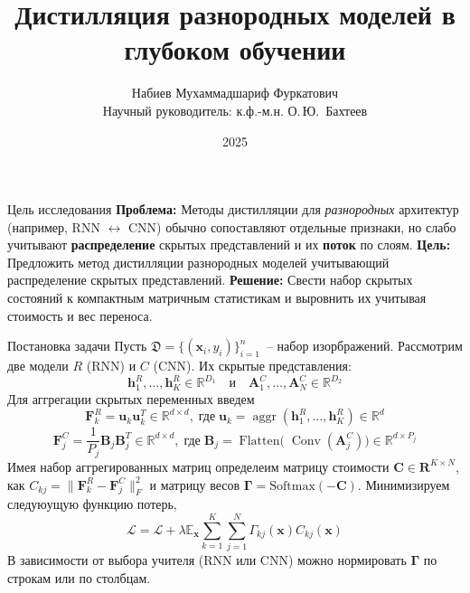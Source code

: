 \documentclass{beamer}
\title{Дистилляция разнородных моделей в глубоком обучении}
\author[М.\,Ф. Набиев]{
    Набиев Мухаммадшариф Фуркатович \\
    Научный руководитель: к.ф.-м.н. О.\,Ю.~Бахтеев
}
\institute[Московский физико-технический институт]{
\small{
    Московский физико-технический институт \\
    Кафедра интеллектуальных систем ФПМИ МФТИ 
}}
\date{2025}
\begin{document}
\begin{frame}
\thispagestyle{empty}
\maketitle
\end{frame}
\begin{frame}{Цель исследования}
\textbf{Проблема:} Методы дистилляции для \emph{разнородных} архитектур (например, RNN $\leftrightarrow$ CNN) обычно сопоставляют отдельные признаки, но слабо учитывают \textbf{распределение} скрытых представлений и их \textbf{поток} по слоям.
\newline 
\newline 
\textbf{Цель:} Предложить метод дистилляции разнородных моделей учитывающий распределение скрытых представлений.
\newline
\newline
\textbf{Решение:} Свести набор скрытых состояний к компактным матричным статистикам и выровнить их учитывая стоимость и вес переноса.
\end{frame}
\begin{frame}{Постановка задачи}
\small
Пусть \(\mathfrak{D} = \{(\mathbf{x}_i, y_i)\}_{i=1}^n\)~-- набор изорбражений. Рассмотрим две модели \(R\) (RNN) и \(C\) (CNN). Их скрытые представления:
\[
    \mathbf{h}_1^R, \dots, \mathbf{h}_K^R \in \mathbb{R}^{D_1} \quad \text{и} \quad 
    \mathbf{A}_1^C, \dots, \mathbf{A}_N^C \in \mathbb{R}^{D_2}
\]
Для аггрегации скрытых переменных введем 
\[
    \mathbf{F}_k^R = \mathbf{u}_k\mathbf{u}_k^T \in \mathbb{R}^{d\times d}, \; \text{где} \; \mathbf{u}_k = \operatorname{aggr}(\mathbf{h}^R_1, \dots, \mathbf{h}^R_K) \in \mathbb{R}^{d}
\]
\[
    \mathbf{F}_j^C = \frac{1}{P_j} \mathbf{B}_j \mathbf{B}_j^T \in \mathbb{R}^{d\times d}, \; \text{где} \; \mathbf{B}_j = \operatorname{Flatten(}\operatorname{Conv}(\mathbf{A}_j^C)) \in \mathbb{R}^{d \times P_j}
\]
Имея набор аггрегированных матриц определеим матрицу стоимости \(\mathbf{C}\in \mathbf{R}^{K\times N}\), как \(C_{kj} = \| \mathbf{F}_k^R - \mathbf{F}_j^C \|_F^2\) и матрицу весов \(\boldsymbol{\Gamma} = \operatorname{Softmax(- \mathbf{C})}\).
Минимизируем следуюущую функцию потерь, 
\[
    \mathcal{L} = \mathcal{L} + \lambda \mathbb{E}_{\mathbf{x}} \sum_{k=1}^K \sum_{j=1}^N \Gamma_{kj}(\mathbf{x}) C_{kj}(\mathbf{x})
\]
В зависимости от выбора учителя (RNN или CNN) можно нормировать $\boldsymbol{\Gamma}$ по строкам или по столбцам.
\end{frame}
\end{document}
